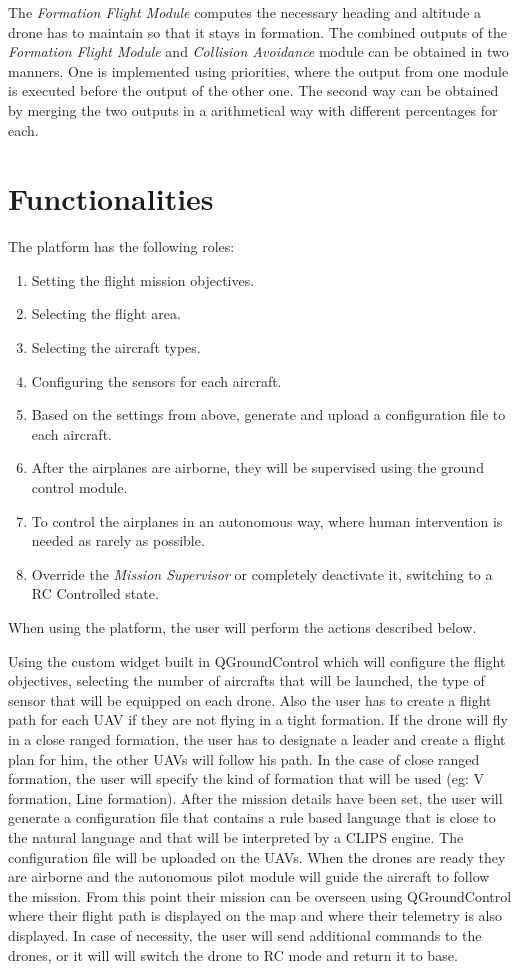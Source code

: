 The \textit{Formation Flight Module} computes the necessary heading and altitude
a drone has to maintain so that it stays in formation. The combined outputs 
of the \textit{Formation Flight Module} and \textit{Collision Avoidance} module
can be obtained in two manners. One is implemented using priorities, where the
output from one module is executed before the output of the other one. The second
way can be obtained by merging the two outputs in a arithmetical way with different
percentages for each.

\section{Functionalities}
\label{sec:functionalities}

The platform has the following roles:
\begin{enumerate}
\item Setting the flight mission objectives.
\item Selecting the flight area.
\item Selecting the aircraft types.
\item Configuring the sensors for each aircraft.
\item Based on the settings from above, generate and upload a configuration file
to each aircraft.
\item After the airplanes are airborne, they will be supervised using the 
ground control module.
\item To control the airplanes in an autonomous way, where human intervention is
needed as rarely as possible.
\item Override the \textit{Mission Supervisor} or completely deactivate it, 
switching to a RC Controlled state.
\end{enumerate}

When using the platform,  the user will perform the actions described below.

Using the custom widget built in QGroundControl which will configure the flight objectives, 
selecting the number of aircrafts that will be launched, the type of sensor that
will be equipped on each drone. Also the user has to create a flight path for 
each UAV if they are not flying in a tight formation. If the drone will fly in 
a close ranged formation, the user has to designate a leader and create a flight
plan for him, the other UAVs will follow his path. In the case of close ranged 
formation, the user will specify the kind of formation that will be used (eg: 
  V formation, Line formation). After the mission details have been set, the user
will generate a configuration file that contains a rule based language that
is close to the natural language and that will be interpreted by a CLIPS engine.
The configuration file will be uploaded on the UAVs. When the drones are ready
they are airborne and the autonomous pilot module will guide the aircraft to follow the mission.
From this point their mission can be overseen using QGroundControl where their
flight path is displayed on the map and where their telemetry is also displayed.
In case of necessity, the user will send additional commands to the drones, or
it will will switch the drone to RC mode and return it to base.

